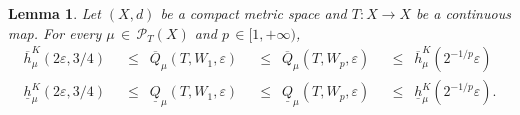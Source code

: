 \documentclass[11pt,a4paper,reqno]{amsart}
\theoremstyle{plain}
\newtheorem{lemma}[theorem]{Lemma}
\theoremstyle{definition}
\newcommand{\ep} {\varepsilon}
\newcommand{\cP}{{\mathcal P}}
\begin{document}
\begin{lemma}\label{QuantGrowthRate}
Let $(X,d)$ be a compact metric space and $T\colon X \to X$ be a continuous map. For every $\mu\,\in\,\cP_T(X)$ and $p\,\in[1, +\infty)$,
\begin{equation}
\begin{alignedat}{4}\label{ineq}
\overline{h}^K_\mu(2\ep,3/4)\,\,\,
&\leq\,\,\,\overline{Q}_\mu(T,W_1,\ep)\,\,\,
&\leq\,\,\,\overline{Q}_\mu(T,W_p,\ep)\,\,\,
&\leq\,\,\,\overline{h}^K_\mu(2^{-1/p}\ep)
\\ \nonumber
\underline{h}^K_\mu(2\ep,3/4)\,\,\,
&\leq\,\,\,\underline{Q}_\mu(T,W_1,\ep)\,\,\,
&\leq\,\,\,\underline{Q}_\mu(T,W_p,\ep)\,\,\,
&\leq\,\,\,\underline{h}^K_\mu(2^{-1/p}\ep).
\end{alignedat}
\end{equation}
\end{lemma}
\end{document}
